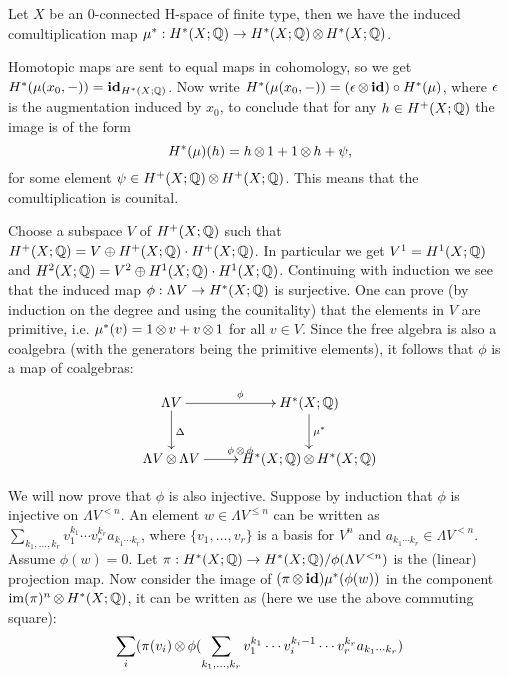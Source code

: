 
Let $X$ be an $0$-connected H-space of finite type, then we have the induced comultiplication map $\mu^\ast: H^\ast(X; \mathbb{Q}) \to H^\ast(X; \mathbb{Q}) \operatorname*{\otimes} H^\ast(X; \mathbb{Q})$.

Homotopic maps are sent to equal maps in cohomology, so we get $H^\ast(\mu(x_0, -)) = \mathbf{id}_{H^\ast(X; \mathbb{Q})}$. Now write $H^\ast(\mu(x_0, -)) = (\epsilon \operatorname*{\otimes} \mathbf{id}) \circ H^\ast(\mu)$, where $\epsilon$ is the augmentation induced by $x_0$, to conclude that for any $h \in H^{+}(X; \mathbb{Q})$ the image is of the form
$$ H^\ast(\mu)(h) = h \operatorname*{\otimes} 1 + 1 \operatorname*{\otimes} h + \psi, $$
for some element $\psi \in H^{+}(X; \mathbb{Q}) \operatorname*{\otimes} H^{+}(X; \mathbb{Q})$. This means that the comultiplication is counital.

Choose a subspace $V$ of $H^+(X; \mathbb{Q})$ such that $H^+(X; \mathbb{Q}) = V \oplus H^+(X; \mathbb{Q}) \cdot H^+(X; \mathbb{Q})$. In particular we get $V^1 = H^1(X; \mathbb{Q})$ and $H^2(X; \mathbb{Q}) = V^2 \oplus H^1(X; \mathbb{Q}) \cdot H^1(X; \mathbb{Q})$. Continuing with induction we see that the induced map $\phi : \Lambda V \to H^\ast(X; \mathbb{Q})$ is surjective. One can prove (by induction on the degree and using the counitality) that the elements in $V$ are primitive, i.e. $\mu^\ast(v) = 1 \operatorname*{\otimes} v + v \operatorname*{\otimes} 1$ for all $v \in V$. Since the free algebra is also a coalgebra (with the generators being the primitive elements), it follows that $\phi$ is a map of coalgebras:
\[ \xymatrix{
	\Lambda V \ar[r]^\phi \ar[d]^\Delta & H^\ast(X; \Q) \ar[d]^{\mu^\ast} \\
	\Lambda V \tensor \Lambda V \ar[r]^{\phi\tensor\phi} & H^\ast(X; \Q) \tensor H^\ast(X; \Q) \\
} \]

We will now prove that $\phi$ is also injective. Suppose by induction that $\phi$ is injective on $\Lambda V^{<n}$. An element $w \in \Lambda V^{\leq n}$ can be written as $\sum_{k_1, \ldots, k_r} v_1^{k_1} \cdots v_r^{k_r} a_{k_1 \cdots k_r}$, where $\{v_1, \ldots, v_r\}$ is a basis for $V^n$ and $a_{k_1 \cdots k_r} \in \Lambda V^{<n}$. Assume $\phi(w) = 0$. Let $\pi : H^\ast(X; \mathbb{Q}) \to H^\ast(X; \mathbb{Q}) / \phi(\Lambda V^{<n})$ is the (linear) projection map. Now consider the image of $(\pi \operatorname*{\otimes} \mathbf{id}) \mu^\ast (\phi(w))$ in the component $\operatorname*{im}(\pi)^n \operatorname*{\otimes} H^\ast(X; \mathbb{Q})$, it can be written as (here we use the above commuting square):
\[ \sum_i ( \pi(v_i) \operatorname*{\otimes} \phi(\sum_{k_1, \ldots, k_r} v_1^{k_1} \cdots v_i^{k_i - 1} \cdots v_r^{k_r}a_{k_1 \cdots k_r}) \]

